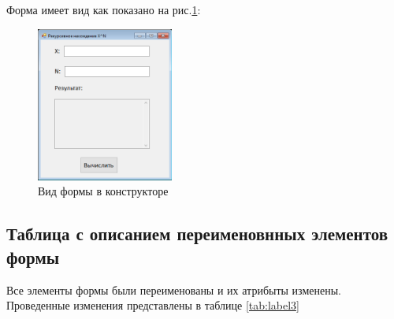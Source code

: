 Форма имеет вид как показано на рис.\ref{fig:FormInConstruct3}:

\begin{figure}[!h]
    \centering
    \includegraphics[width = 0.4\textwidth]{images/Task3/FormInConstructor.png}
    \caption{Вид формы в конструкторе}
    \label{fig:FormInConstruct3}
\end{figure}

\newpage

\subsection{Таблица с описанием переименовнных элементов формы}

Все элементы формы были переименованы и их атрибыты изменены. Проведенные изменения представлены в таблице \ref{tab:label3}

